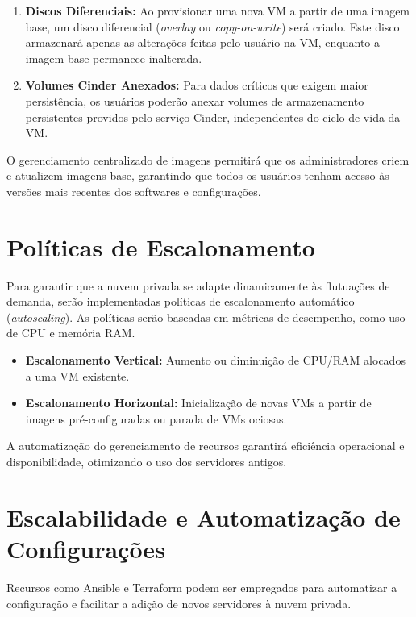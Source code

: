 \begin{enumerate}
 \item \textbf{Discos Diferenciais:} Ao provisionar uma nova VM a partir de uma imagem base, um disco diferencial (\textit{overlay} ou \textit{copy-on-write}) será criado. Este disco armazenará apenas as alterações feitas pelo usuário na VM, enquanto a imagem base permanece inalterada.
 \item \textbf{Volumes Cinder Anexados:} Para dados críticos que exigem maior persistência, os usuários poderão anexar volumes de armazenamento persistentes providos pelo serviço Cinder, independentes do ciclo de vida da VM.
\end{enumerate}

O gerenciamento centralizado de imagens permitirá que os administradores criem e atualizem imagens base, garantindo que todos os usuários tenham acesso às versões mais recentes dos softwares e configurações.

\section{Políticas de Escalonamento}

Para garantir que a nuvem privada se adapte dinamicamente às flutuações de demanda, serão implementadas políticas de escalonamento automático (\textit{autoscaling}). As políticas serão baseadas em métricas de desempenho, como uso de CPU e memória RAM.

\begin{itemize}
 \item \textbf{Escalonamento Vertical:} Aumento ou diminuição de CPU/RAM alocados a uma VM existente.
 \item \textbf{Escalonamento Horizontal:} Inicialização de novas VMs a partir de imagens pré-configuradas ou parada de VMs ociosas.
\end{itemize}

A automatização do gerenciamento de recursos garantirá eficiência operacional e disponibilidade, otimizando o uso dos servidores antigos.


\section{Escalabilidade e Automatização de Configurações}

Recursos como Ansible e Terraform podem ser empregados para automatizar a configuração e facilitar a adição de novos servidores à nuvem privada.


